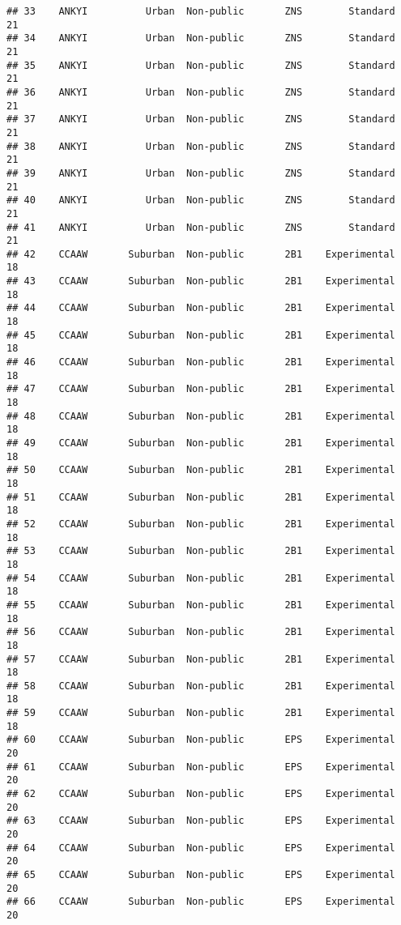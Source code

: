 \documentclass[
]{article}
\begin{document}
\begin{verbatim}
## 33    ANKYI          Urban  Non-public       ZNS        Standard        21
## 34    ANKYI          Urban  Non-public       ZNS        Standard        21
## 35    ANKYI          Urban  Non-public       ZNS        Standard        21
## 36    ANKYI          Urban  Non-public       ZNS        Standard        21
## 37    ANKYI          Urban  Non-public       ZNS        Standard        21
## 38    ANKYI          Urban  Non-public       ZNS        Standard        21
## 39    ANKYI          Urban  Non-public       ZNS        Standard        21
## 40    ANKYI          Urban  Non-public       ZNS        Standard        21
## 41    ANKYI          Urban  Non-public       ZNS        Standard        21
## 42    CCAAW       Suburban  Non-public       2B1    Experimental        18
## 43    CCAAW       Suburban  Non-public       2B1    Experimental        18
## 44    CCAAW       Suburban  Non-public       2B1    Experimental        18
## 45    CCAAW       Suburban  Non-public       2B1    Experimental        18
## 46    CCAAW       Suburban  Non-public       2B1    Experimental        18
## 47    CCAAW       Suburban  Non-public       2B1    Experimental        18
## 48    CCAAW       Suburban  Non-public       2B1    Experimental        18
## 49    CCAAW       Suburban  Non-public       2B1    Experimental        18
## 50    CCAAW       Suburban  Non-public       2B1    Experimental        18
## 51    CCAAW       Suburban  Non-public       2B1    Experimental        18
## 52    CCAAW       Suburban  Non-public       2B1    Experimental        18
## 53    CCAAW       Suburban  Non-public       2B1    Experimental        18
## 54    CCAAW       Suburban  Non-public       2B1    Experimental        18
## 55    CCAAW       Suburban  Non-public       2B1    Experimental        18
## 56    CCAAW       Suburban  Non-public       2B1    Experimental        18
## 57    CCAAW       Suburban  Non-public       2B1    Experimental        18
## 58    CCAAW       Suburban  Non-public       2B1    Experimental        18
## 59    CCAAW       Suburban  Non-public       2B1    Experimental        18
## 60    CCAAW       Suburban  Non-public       EPS    Experimental        20
## 61    CCAAW       Suburban  Non-public       EPS    Experimental        20
## 62    CCAAW       Suburban  Non-public       EPS    Experimental        20
## 63    CCAAW       Suburban  Non-public       EPS    Experimental        20
## 64    CCAAW       Suburban  Non-public       EPS    Experimental        20
## 65    CCAAW       Suburban  Non-public       EPS    Experimental        20
## 66    CCAAW       Suburban  Non-public       EPS    Experimental        20

\end{verbatim}
\end{document}
